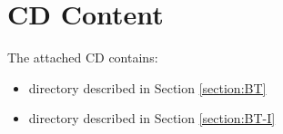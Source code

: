 





\chapter{CD Content}

The attached CD contains:
\begin{itemize}
    \item {} directory described in Section \ref{section:BT}
    \item {} directory described in Section \ref{section:BT-I}
\end{itemize}


